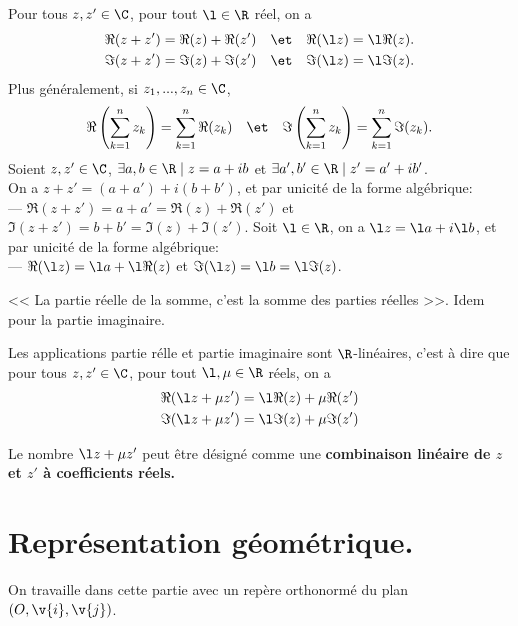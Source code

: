 \documentclass[11pt]{article}
\begin{document}
\begin{prop}{}{}
    Pour tous $z,z'\in\C$, pour tout $\l\in\R$ réel, on a
    \begin{align*}
        \Re(z+z')=\Re(z)+\Re(z')\quad\et\quad\Re(\l z)=\l\Re(z).\\
        \Im(z+z')=\Im(z)+\Im(z')\quad\et\quad\Im(\l z)=\l\Im(z).
    \end{align*}
    Plus généralement, si $z_1,...,z_n\in\C$,
    \begin{equation*}
        \Re\left( \sum_{k=1}^nz_k \right)=\sum_{k=1}^n\Re(z_k)\quad\et\quad\Im\left( \sum_{k=1}^nz_k \right)=\sum_{k=1}^n\Im(z_k).
    \end{equation*}
    \tcblower
    Soient $z,z'\in\C$, $\exists a,b\in\R\mid z=a+ib$ et $\exists a',b'\in\R\mid z'=a'+ib'$.\\
    On a $z+z'=(a+a')+i(b+b')$, et par unicité de la forme algébrique:\\
    --- $\Re(z+z')=a+a'=\Re(z)+\Re(z')$ et $\Im(z+z')=b+b'=\Im(z)+\Im(z')$.\n
    Soit $\l\in\R$, on a $\l z = \l a + i\l b$, et par unicité de la forme algébrique:\\
    --- $\Re(\l z)=\l a + \l\Re(z)$ et $\Im(\l z)=\l  b =\l\Im(z)$. 
\end{prop}
<< La partie réelle de la somme, c'est la somme des parties réelles >>. Idem pour la partie imaginaire.

\begin{corr}{}{}
    Les applications partie rélle et partie imaginaire sont $\R$-linéaires, c'est à dire que pour tous $z,z'\in\C$, pour tout $\l,\mu \in\R$ réels, on a
    \begin{align*}
        \Re(\l z + \mu z')=\l\Re(z)+\mu\Re(z')\\
        \Im(\l z+\mu z')=\l\Im(z)+\mu\Im(z')
    \end{align*}
\end{corr}

Le nombre $\l z + \mu z'$ peut être désigné comme une \bf{combinaison linéaire} de $z$ et $z'$ à coefficients réels.

\section{Représentation géométrique.}

On travaille dans cette partie avec un repère orthonormé du plan $(O,\v{i}, \v{j})$.
\end{document}
